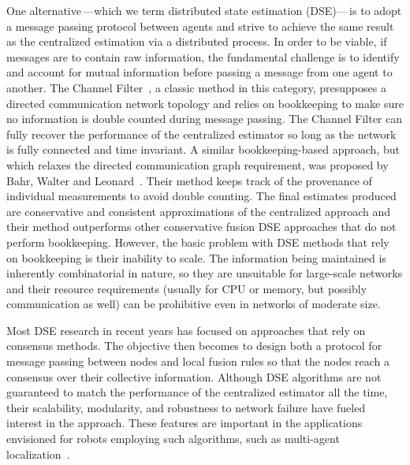 \documentclass[journal]{IEEEtran}
\theoremstyle{remark}
\theoremstyle{definition}
\begin{document}
One alternative\,---which we term distributed state estimation (DSE)---\,is to
adopt a message passing protocol between agents and strive to achieve the same
result as the centralized estimation via a distributed process.  In order to be
viable, if messages are to contain raw information, the fundamental challenge
is to identify and account for mutual information before passing a message from
one agent to another. The Channel Filter~\cite{durrant2001data}, a classic
method in this category, presupposes a directed communication network topology
and relies on bookkeeping to make sure no information is double counted during
message passing. The Channel Filter can fully recover the performance of the
centralized estimator so long as the network is fully connected and time
invariant. A similar bookkeeping-based approach, but which  relaxes the
directed communication graph requirement, was proposed by Bahr, Walter and
Leonard~\cite{bahr09consistent}. Their method keeps track of the provenance of
individual measurements to avoid double counting.  The final estimates produced
are conservative and consistent approximations of the centralized approach and
their method outperforms other conservative fusion DSE approaches that do not
perform bookkeeping. However, the basic problem with DSE methods that rely on
bookkeeping is their inability to scale.  The information being maintained is
inherently combinatorial in nature, so they are unsuitable for large-scale
networks and their resource requirements (usually for CPU or memory, but
possibly communication as well) can be prohibitive even in networks of moderate
size.

Most DSE research in recent years has focused on approaches that rely on
consensus methods.  The objective then becomes to design both a protocol for
message passing between nodes and local fusion rules so that the nodes reach a
consensus over their collective information.  Although DSE algorithms are not
guaranteed to match the performance of the centralized estimator all the time,
their scalability, modularity, and robustness to network failure have fueled
interest in the approach. These features are important in the
applications envisioned for robots employing such algorithms, such as
multi-agent localization~\cite{simonetto10distributed}.
\end{document}
